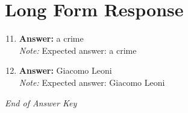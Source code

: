 \documentclass[12pt]{article}
\begin{document}
\section*{Long Form Response}
\begin{enumerate}[label=\arabic*.]
\setcounter{enumi}{10}
\item \textbf{Answer:} a crime
\\ \textit{Note:} Expected answer: a crime
\item \textbf{Answer:} Giacomo Leoni
\\ \textit{Note:} Expected answer: Giacomo Leoni
\end{enumerate}

\vfill
\noindent\textit{End of Answer Key}
\end{document}
